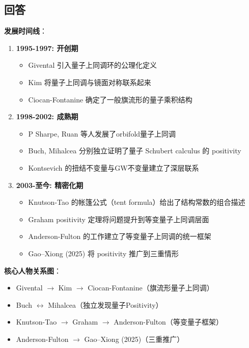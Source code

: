 \subsection{回答}
\textbf{发展时间线}：
\begin{enumerate}
\item \textbf{1995-1997: 开创期}
  \begin{itemize}
  \item Givental 引入量子上同调环的公理化定义
  \item Kim 将量子上同调与镜面对称联系起来
  \item Ciocan-Fontanine 确定了一般旗流形的量子乘积结构
  \end{itemize}

\item \textbf{1998-2002: 成熟期}
  \begin{itemize}
  \item P Sharpe, Ruan 等人发展了orbifold量子上同调
  \item Buch, Mihalcea 分别独立证明了量子 Schubert calculus 的 positivity
  \item Kontsevich 的扭结不变量与GW不变量建立了深层联系
  \end{itemize}

\item \textbf{2003-至今: 精密化期}
  \begin{itemize}
  \item Knutson-Tao 的帐篷公式（tent formula）给出了结构常数的组合描述
  \item Graham positivity 定理将问题提升到等变量子上同调层面
  \item Anderson-Fulton 的工作建立了等变量子上同调的统一框架
  \item Gao--Xiong \cite{GX2025} (2025) 将 positivity 推广到三重情形
  \end{itemize}
\end{enumerate}

\textbf{核心人物关系图}：
\begin{itemize}
\item Givental $\rightarrow$ Kim $\rightarrow$ Ciocan-Fontanine（旗流形量子上同调）
\item Buch $\leftrightarrow$ Mihalcea（独立发现量子Positivity）
\item Knutson-Tao $\rightarrow$ Graham $\rightarrow$ Anderson-Fulton（等变量子框架）
\item Anderson-Fulton $\rightarrow$ Gao--Xiong \cite{GX2025} (2025)（三重推广）
\end{itemize}

